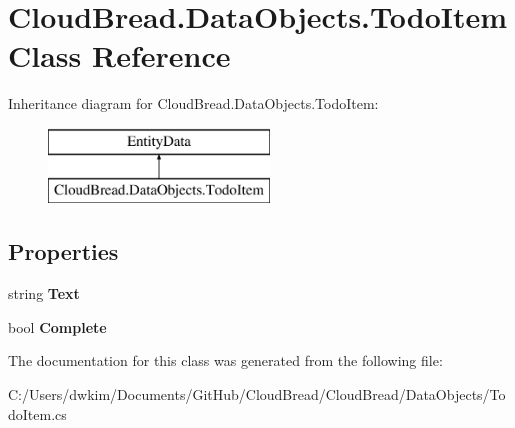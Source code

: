 \hypertarget{a00187}{}\section{Cloud\+Bread.\+Data\+Objects.\+Todo\+Item Class Reference}
\label{a00187}
Inheritance diagram for Cloud\+Bread.\+Data\+Objects.\+Todo\+Item\+:\begin{figure}[H]
\begin{center}
\leavevmode
\includegraphics[height=2.000000cm]{a00187}
\end{center}
\end{figure}
\subsection*{Properties}
\begin{DoxyCompactItemize}
\item 
string {\bfseries Text}\hypertarget{a00187_a92bc3a18d35fe87c89d1209d8962c254}{}\label{a00187_a92bc3a18d35fe87c89d1209d8962c254}

\item 
bool {\bfseries Complete}\hypertarget{a00187_a0e5fa4c8b2ca710b5065bdbfe695036e}{}\label{a00187_a0e5fa4c8b2ca710b5065bdbfe695036e}

\end{DoxyCompactItemize}


The documentation for this class was generated from the following file\+:\begin{DoxyCompactItemize}
\item 
C\+:/\+Users/dwkim/\+Documents/\+Git\+Hub/\+Cloud\+Bread/\+Cloud\+Bread/\+Data\+Objects/Todo\+Item.\+cs\end{DoxyCompactItemize}
